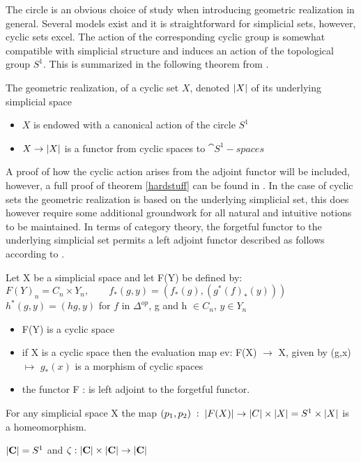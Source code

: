 \documentclass[../../main.tex]{subfiles}
\begin{document}
    The circle is an obvious choice of study when introducing geometric realization in general. Several models exist and it is straightforward for simplicial sets, however, cyclic sets excel. The action of the corresponding cyclic group is somewhat compatible with simplicial structure and induces an action of the topological group $S^1$. This is summarized in the following theorem from \cite{loday-cyclic}.

    \begin{theorem}\label{hardstuff}
        The geometric realization, of a cyclic set $X$, denoted $\geom[X]$ of its underlying simplicial space
        \begin{itemize}
            \item $X$ is endowed with a canonical action of the circle $S^1$
            \item $X \to \geom[X]$ is a functor from cyclic spaces to $\cat{S^1-spaces}$
        \end{itemize}
    \end{theorem} %

    A proof of how the cyclic action arises from the adjoint functor will be included, however, a full proof of theorem \ref{hardstuff} can be found in \cite{loday-cyclic}. In the case of cyclic sets the geometric realization is based on the underlying simplicial set, this does however require some additional groundwork for all natural and intuitive notions to be maintained. In terms of category theory, the forgetful functor to the underlying simplicial set permits a left adjoint functor described as follows according to \cite{loday-cyclic}. 

    \begin{definition}
        Let X be a simplicial space and let F(Y) be defined by:
        $F(Y)_n=C_n\times Y_n, \qquad f_*(g,y)=(f_*(g), (g^*(f)_*(y)))$
        $h^*(g,y) = (hg,y) $ for $f$ in $\Delta^{op}$, g and h $\in C_n$, $y\in Y_n$
    \end{definition} 
    
    \begin{lemma}
        \begin{itemize}
            \item F(Y) is a cyclic space
            \item if X is a cyclic space then the evaluation map ev: F(X) $\to$ X, given by (g,x) $\mapsto$ $g_*(x)$ is a morphism of cyclic spaces
            \item the functor F : is left adjoint to the forgetful functor.
        \end{itemize}
    \end{lemma}

    \begin{lemma}
        For any simplicial space X the map $(p_1,p_2)\; : \;\geom[F(X)]\to \geom[C]\times \geom[X]= S^1\times \geom[X]$ is a homeomorphism. 
    \end{lemma}

    \begin{lemma}
        $\geom[\cat{C}]= S^1$ and $\zeta : \geom[\cat{C}]\times \geom[\cat{C}]\to \geom[\cat{C}]$
    \end{lemma}
\end{document}
